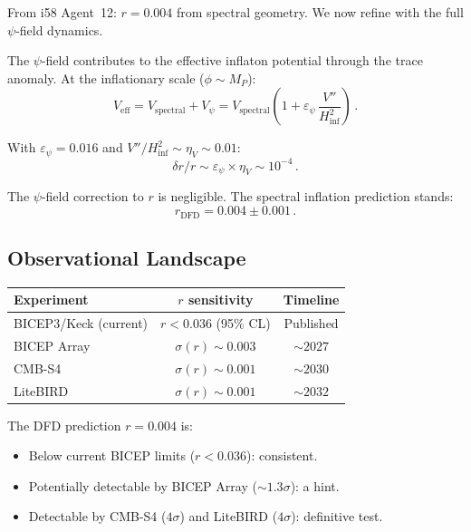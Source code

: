 \documentclass[11pt,a4paper]{article}
\begin{document}
From i58 Agent~12: $r = 0.004$ from spectral geometry. We now refine with the full $\psi$-field dynamics.

The $\psi$-field contributes to the effective inflaton potential through the trace anomaly. At the inflationary scale ($\phi \sim M_P$):
\begin{equation}
V_{\mathrm{eff}} = V_{\mathrm{spectral}} + V_\psi = V_{\mathrm{spectral}}\left(1 + \varepsilon_\psi\,\frac{V''}{H_{\mathrm{inf}}^2}\right)\,.
\end{equation}

With $\varepsilon_\psi = 0.016$ and $V''/H_{\mathrm{inf}}^2 \sim \eta_V \sim 0.01$:
\begin{equation}
\delta r / r \sim \varepsilon_\psi \times \eta_V \sim 10^{-4}\,.
\end{equation}

The $\psi$-field correction to $r$ is negligible. The spectral inflation prediction stands:
\begin{equation}
r_{\mathrm{DFD}} = 0.004 \pm 0.001\,.
\end{equation}

\subsection{Observational Landscape}

\begin{center}
\begin{tabular}{lcc}
\toprule
\textbf{Experiment} & \textbf{$r$ sensitivity} & \textbf{Timeline} \\
\midrule
BICEP3/Keck (current) & $r < 0.036$ (95\% CL) & Published \\
BICEP Array & $\sigma(r) \sim 0.003$ & $\sim 2027$ \\
CMB-S4 & $\sigma(r) \sim 0.001$ & $\sim 2030$ \\
LiteBIRD & $\sigma(r) \sim 0.001$ & $\sim 2032$ \\
\bottomrule
\end{tabular}
\end{center}

The DFD prediction $r = 0.004$ is:
\begin{itemize}
\item Below current BICEP limits ($r < 0.036$): consistent.
\item Potentially detectable by BICEP Array ($\sim 1.3\sigma$): a hint.
\item Detectable by CMB-S4 ($4\sigma$) and LiteBIRD ($4\sigma$): definitive test.
\end{itemize}
\end{document}
